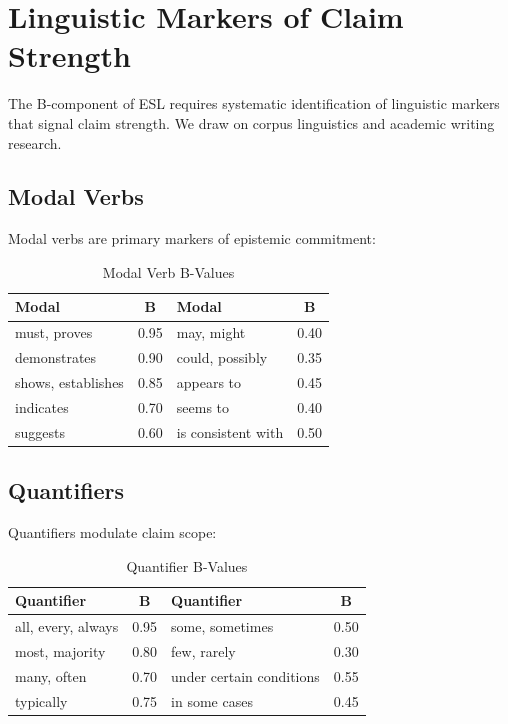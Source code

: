 \documentclass[11pt,a4paper]{article}
\begin{document}
\section{Linguistic Markers of Claim Strength}

The B-component of ESL requires systematic identification of linguistic
markers that signal claim strength. We draw on corpus linguistics and
academic writing research.

\subsection{Modal Verbs}

Modal verbs are primary markers of epistemic commitment:

\begin{table}[h]
\centering
\caption{Modal Verb B-Values}
\label{tab:modals}
\begin{tabular}{lc|lc}
\toprule
\textbf{Modal} & \textbf{B} & \textbf{Modal} & \textbf{B} \\
\midrule
must, proves & 0.95 & may, might & 0.40 \\
demonstrates & 0.90 & could, possibly & 0.35 \\
shows, establishes & 0.85 & appears to & 0.45 \\
indicates & 0.70 & seems to & 0.40 \\
suggests & 0.60 & is consistent with & 0.50 \\
\bottomrule
\end{tabular}
\end{table}

\subsection{Quantifiers}

Quantifiers modulate claim scope:

\begin{table}[h]
\centering
\caption{Quantifier B-Values}
\label{tab:quantifiers}
\begin{tabular}{lc|lc}
\toprule
\textbf{Quantifier} & \textbf{B} & \textbf{Quantifier} & \textbf{B} \\
\midrule
all, every, always & 0.95 & some, sometimes & 0.50 \\
most, majority & 0.80 & few, rarely & 0.30 \\
many, often & 0.70 & under certain conditions & 0.55 \\
typically & 0.75 & in some cases & 0.45 \\
\bottomrule
\end{tabular}
\end{table}
\end{document}

